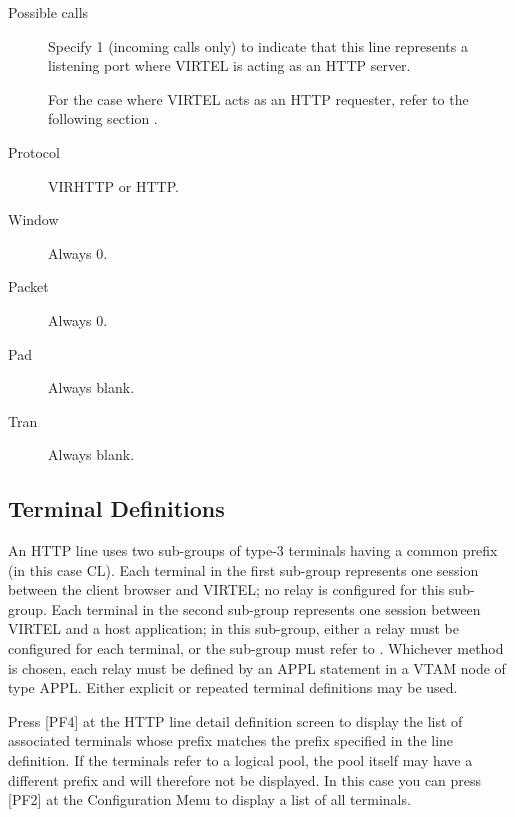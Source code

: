 \documentclass[letterpaper,10pt,english]{sphinxmanual}
\begin{document}
\begin{description}
\item[{Possible calls}] \leavevmode
Specify 1 (incoming calls only) to indicate that this line
represents a listening port where VIRTEL is acting as an HTTP
server.

For the case where VIRTEL acts as an HTTP requester, refer to the following section {\hyperref[\detokenize{connectivity_guide:v457cn-httpoutbound}]{}}.

\item[{Protocol}] \leavevmode
VIRHTTP or HTTP.

\item[{Window}] \leavevmode
Always 0.

\item[{Packet}] \leavevmode
Always 0.

\item[{Pad}] \leavevmode
Always blank.

\item[{Tran}] \leavevmode
Always blank.

\end{description}


\subsection{Terminal Definitions}
\label{\detokenize{connectivity_guide:index-12}}\label{\detokenize{connectivity_guide:terminal-definitions}}
An HTTP line uses two sub-groups of type-3 terminals having a common prefix (in this case CL). Each terminal in the first sub-group represents one session between the client browser and VIRTEL; no relay is configured for this sub-group. Each terminal in the second sub-group represents one session between VIRTEL and a host application; in this sub-group, either a relay must be configured for each terminal, or the sub-group must refer to {\hyperref[\detokenize{connectivity_guide:v457cn-logicalpool}]{}}. Whichever method is chosen, each relay must be defined by an APPL statement in a VTAM node of type APPL. Either explicit or repeated terminal definitions may be used.

Press {[}PF4{]} at the HTTP line detail definition screen to display the list of associated terminals whose prefix matches the prefix specified in the line definition. If the terminals refer to a logical pool, the pool itself may have a different prefix and will therefore not be displayed. In this case you can press {[}PF2{]} at the Configuration Menu to display a list of all terminals.
\end{document}
